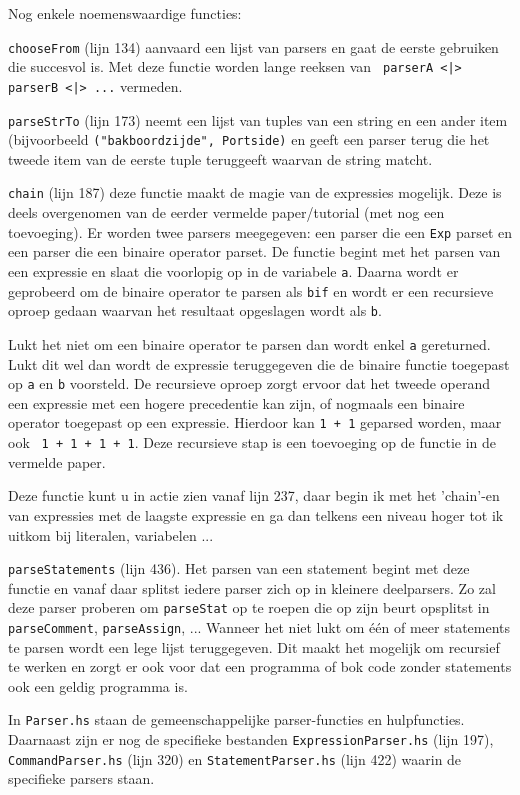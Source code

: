 \documentclass[11pt]{article}
\begin{document}
Nog enkele noemenswaardige functies:
\begin{description}
    \item{\tt chooseFrom} (lijn 134) aanvaard een lijst van parsers en gaat de eerste gebruiken die succesvol is. Met deze functie worden lange reeksen van \texttt{ parserA <|> parserB <|> ...} vermeden.
    \item{\tt parseStrTo} (lijn 173) neemt een lijst van tuples van een string en een ander item (bijvoorbeeld \texttt{("bakboordzijde", Portside)} en geeft een parser terug die het tweede item van de eerste tuple teruggeeft waarvan de string matcht.
    \item{\tt chain} (lijn 187) deze functie maakt de magie van de expressies mogelijk. Deze is deels overgenomen van de eerder vermelde paper/tutorial (met nog een toevoeging). Er worden twee parsers meegegeven: een parser die een \texttt{Exp} parset en een parser die een binaire operator parset.
        De functie begint met het parsen van een expressie en slaat die voorlopig op in de variabele \texttt{a}. Daarna wordt er geprobeerd om de binaire operator te parsen als \texttt{bif} en wordt er een recursieve oproep gedaan waarvan het resultaat opgeslagen wordt als \texttt{b}.

        Lukt het niet om een binaire operator te parsen dan wordt enkel \texttt{a} gereturned. Lukt dit wel dan wordt de expressie teruggegeven die de binaire functie toegepast op \texttt{a} en \texttt{b} voorsteld. De recursieve oproep zorgt ervoor dat het tweede operand een expressie met een hogere precedentie kan zijn, of nogmaals een binaire operator toegepast op een expressie. Hierdoor kan \texttt{1 + 1} geparsed worden, maar ook \texttt{ 1 + 1 + 1 + 1}. Deze recursieve stap is een toevoeging op de functie in de vermelde paper.

        Deze functie kunt u in actie zien vanaf lijn 237, daar begin ik met het 'chain'-en van expressies met de laagste expressie en ga dan telkens een niveau hoger tot ik uitkom bij literalen, variabelen ...
    \item{\tt parseStatements} (lijn 436). Het parsen van een statement begint met deze functie en vanaf daar splitst iedere parser zich op in kleinere deelparsers. Zo zal deze parser proberen om \texttt{parseStat} op te roepen die op zijn beurt opsplitst in \texttt{parseComment}, \texttt{parseAssign}, ... Wanneer het niet lukt om één of meer statements te parsen wordt een lege lijst teruggegeven. Dit maakt het mogelijk om recursief te werken en zorgt er ook voor dat een programma of bok code zonder statements ook een geldig programma is.
\end{description}
In \texttt{Parser.hs} staan de gemeenschappelijke parser-functies en hulpfuncties. Daarnaast zijn er nog de specifieke bestanden \texttt{ExpressionParser.hs} (lijn 197), \texttt{CommandParser.hs} (lijn 320) en \texttt{StatementParser.hs} (lijn 422) waarin de specifieke parsers staan.
\end{document}
